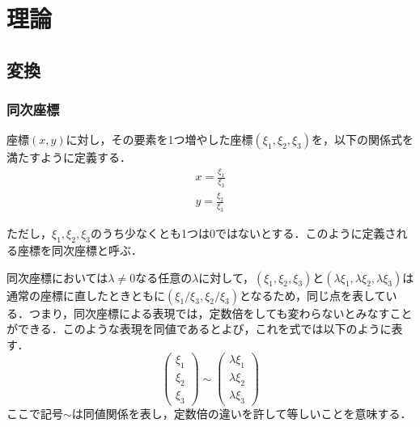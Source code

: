 \documentclass[summary]{nitocs}
\numberwithin{equation}{section}
\begin{document}
    \section{理論} \label{theory}
        \subsection{変換}
            \subsubsection{同次座標}
                座標$(x,y)$に対し，その要素を1つ増やした座標$(\xi_1,\xi_2,\xi_3)$を，以下の関係式を満たすように定義する．\\
                \begin{equation} %
                    \begin{split} %
                        x = \frac{\xi_1}{\xi_3} \\ 
                        y = \frac{\xi_2}{\xi_3}
                    \end{split}
                    \label{Homogeneous}
                \end{equation}

                ただし，$\xi_1,\xi_2,\xi_3$のうち少なくとも1つは0ではないとする．このように定義される座標を同次座標と呼ぶ\cite{DIP}．

                同次座標においては$\lambda\neq0$なる任意の$\lambda$に対して，$(\xi_1,\xi_2,\xi_3)$と$(\lambda\xi_1,\lambda\xi_2,\lambda\xi_3)$は通常の座標に直したときともに$(\xi_1/\xi_3,\xi_2/\xi_3)$となるため，同じ点を表している．つまり，同次座標による表現では，定数倍をしても変わらないとみなすことができる．このような表現を同値であるとよび，これを式では以下のように表す．
                \begin{equation} %
                    \left(
                        \begin{array}{ccc}
                            \xi_1\\
                            \xi_2\\
                            \xi_3
                        \end{array}
                    \right) \sim %
                    \left(
                        \begin{array}{ccc}
                            \lambda\xi_1\\
                            \lambda\xi_2\\
                            \lambda\xi_3
                        \end{array}
                    \right)
                \end{equation}
                ここで記号$\sim$は同値関係を表し，定数倍の違いを許して等しいことを意味する．
\end{document}

